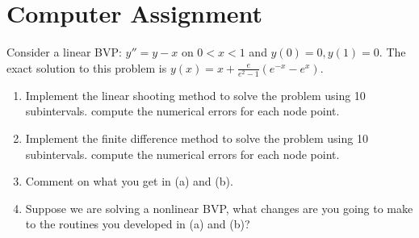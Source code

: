 \documentclass[10pt]{report}
\begin{document}
\section*{Computer Assignment}
Consider a linear BVP: $y'' = y - x$ on $0<x<1$ and $y(0)=0, y(1)=0$. The exact solution to this problem is $y(x) = x + \frac{e}{e^2-1}(e^{-x}-e^x)$.
\begin{enumerate}
	\item 
	Implement the linear shooting method to solve the problem using 10 subintervals. compute the numerical errors for each node point.
	
	\item 
	Implement the finite difference method to solve the problem using 10 subintervals. compute the numerical errors for each node point.
	
	\item 
	Comment on what you get in (a) and (b).
	
	\item 
	Suppose we are solving a nonlinear BVP, what changes are you going to make to the routines you developed in (a) and (b)?
\end{enumerate}
\end{document}
